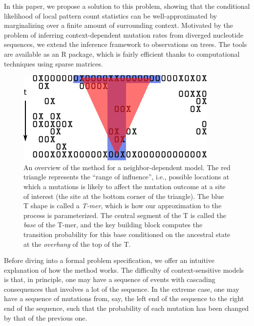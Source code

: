 \documentclass{article}
\theoremstyle{plain}
\theoremstyle{definition}
\begin{document}
In this paper, we propose a solution to this problem,
showing that the conditional likelihood of local pattern count statistics
can be well-approximated by marginalizing over a finite amount of surrounding context.
Motivated by the problem of inferring context-dependent mutation rates from diverged nucleotide sequences,
we extend the inference framework to observations on trees.
The tools are available as an R package,
which is fairly efficient thanks to
computational techniques using sparse matrices.

\begin{figure}
    \begin{center}
        \includegraphics{overview}
    \end{center}
    \caption{
        An overview of the method for a neighbor-dependent model.
        The red triangle represents the ``range of influence'',
        i.e., possible locations at which a mutations is likely
        to affect the mutation outcome at
        a site of interest (the site at the bottom corner of the triangle).
        The blue T shape is called a \emph{T-mer},
        which is how our approximation to the process is parameterized.
        The central segment of the T is called the \emph{base} of the T-mer,
        and the key building block computes the transition probability
        for this base
        conditioned on the ancestral state at the \emph{overhang}
        of the top of the T.
        \label{fig:overview}
    }
\end{figure}

Before diving into a formal problem specification,
we offer an intuitive explanation of how the method works.
The difficulty of context-sensitive models is that, in principle,
one may have a sequence of events with cascading consequences that involves a lot of the sequence.
In the extreme case, one may have a sequence of mutations from,
say, the left end of the sequence to the right end of the sequence,
such that the probability of each mutation has been changed by that of the previous one.
\end{document}
